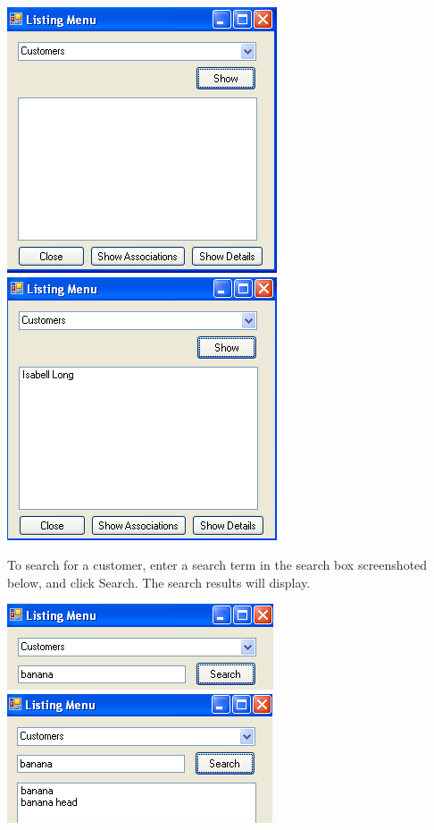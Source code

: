 		\includegraphics[scale=0.5]{customer-frmList-first_scrot}
		\includegraphics[scale=0.5]{customer-frmList-second_scrot}
		
		
		To search for a customer, enter a search term in the search box screenshoted below, and click Search.  The search results will display.
		
		\includegraphics[scale=0.5]{searching_demo_scrot1}
		\includegraphics[scale=0.5]{searching_demo_scrot2}
		 
